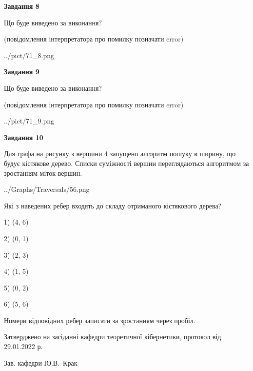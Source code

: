 \documentclass[12pt, ukrainian]{article}
\begin{document}
{\begin {large}
{\begin {center}\textbf{Завдання 8}\end {center}}\par
Що буде виведено за виконання?\par
 (повідомлення інтерпретатора про помилку позначати error)\par
\begin{center}
	{../pict/71_8.png}
\end{center}
\newpage

{\begin {center}\textbf{Завдання 9}\end {center}}\par
Що буде виведено за виконання?\par
 (повідомлення інтерпретатора про помилку позначати error)\par
\begin{center}
	{../pict/71_9.png}
\end{center}
\newpage

{\begin {center}\textbf{Завдання 10}\end {center}}\par
Для графа на рисунку з вершини 4 запущено алгоритм пошуку в ширину, що будує кістякове дерево. Списки суміжності вершин переглядаються алгоритмом за зростанням міток вершин.\par
\begin{center}
	{../Graphs/Traversals/56.png}
\end{center}
\par Які з наведених ребер входять до складу отриманого кістякового дерева?\par
1) (4, 6)\par
2) (0, 1)\par
3) (2, 3)\par
4) (1, 5)\par
5) (0, 2)\par
6) (5, 6)\par
{\vskip 15pt} Номери відповідних ребер записати за зростанням через пробіл.\par
\newpage


\end {large}
}
{\smallskip \begin {small} Затверджено на засіданні кафедри теоретичної кібернетики, протокол  від   29.01.2022 р.\par\smallskip\smallskip
{\parbox {6.5 cm}{Зав. кафедри \dotfill Ю.В.~Крак}} \end{small}}
\end{document}
